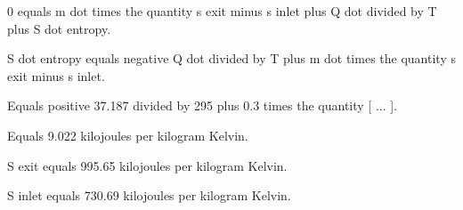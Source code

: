 0 equals m dot times the quantity s exit minus s inlet plus Q dot divided by T plus S dot entropy.  

S dot entropy equals negative Q dot divided by T plus m dot times the quantity s exit minus s inlet.  

Equals positive 37.187 divided by 295 plus 0.3 times the quantity [ ... ].  

Equals 9.022 kilojoules per kilogram Kelvin.  

S exit equals 995.65 kilojoules per kilogram Kelvin.  

S inlet equals 730.69 kilojoules per kilogram Kelvin.